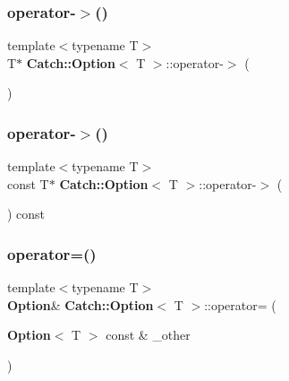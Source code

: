 \subsubsection{operator-\/$>$()\hspace{0.1cm}{\footnotesize\ttfamily [1/2]}}
{\footnotesize\ttfamily template$<$typename T$>$ \\
T$\ast$ \textbf{ Catch\+::\+Option}$<$ T $>$\+::operator-\/$>$ (\begin{DoxyParamCaption}{ }\end{DoxyParamCaption})\hspace{0.3cm}{\ttfamily [inline]}}

\mbox{\label{class_catch_1_1_option_ae8343cbc36dbb95b2dce333d2a6fdc28}} 
\subsubsection{operator-\/$>$()\hspace{0.1cm}{\footnotesize\ttfamily [2/2]}}
{\footnotesize\ttfamily template$<$typename T$>$ \\
const T$\ast$ \textbf{ Catch\+::\+Option}$<$ T $>$\+::operator-\/$>$ (\begin{DoxyParamCaption}{ }\end{DoxyParamCaption}) const\hspace{0.3cm}{\ttfamily [inline]}}

\mbox{\label{class_catch_1_1_option_a78c65b15dd6b2fbd04c5012c43017c8f}} 
\subsubsection{operator=()\hspace{0.1cm}{\footnotesize\ttfamily [1/2]}}
{\footnotesize\ttfamily template$<$typename T$>$ \\
\textbf{ Option}\& \textbf{ Catch\+::\+Option}$<$ T $>$\+::operator= (\begin{DoxyParamCaption}\item[{\textbf{ Option}$<$ T $>$ const \&}]{\+\_\+other }\end{DoxyParamCaption})\hspace{0.3cm}{\ttfamily [inline]}}

\mbox{\label{class_catch_1_1_option_a2be7e343ab22d6061726d32ab4622653}} 
